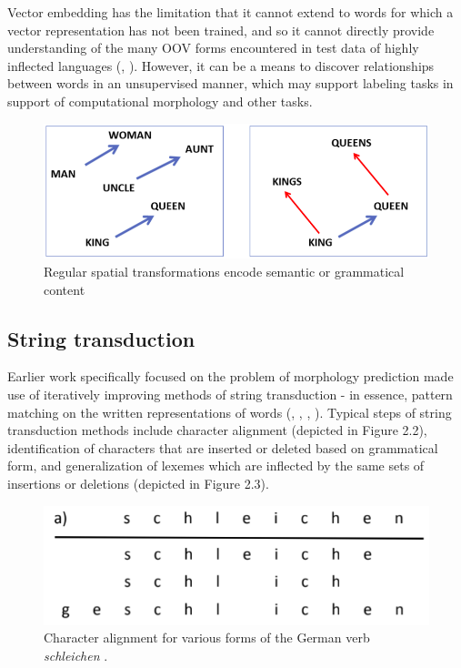 Vector embedding has the limitation that it cannot extend to words for which a vector representation has not been trained, and so it cannot directly provide understanding of the many OOV forms encountered in test data of highly inflected languages (\cite{Soricut2015}, \cite{Cotterell2019}). However, it can be a means to discover relationships between words in an unsupervised manner, which may support labeling tasks in support of computational morphology and other tasks.

\begin{figure}[t]
\includegraphics[width=12cm]{images/semantic_transform.png}
\centering
\caption{Regular spatial transformations encode semantic or grammatical content \parencite{Mikolov2013}}
\end{figure}

\subsection{String transduction}

Earlier work specifically focused on the problem of morphology prediction made use of iteratively improving methods of string transduction - in essence, pattern matching on the written representations of words (\cite{Durrett2013}, \cite{Hulden2014}, \cite{Nicolai2015}, \cite{Ahlberg2015}). Typical steps of string transduction methods include character alignment (depicted in Figure 2.2), identification of characters that are inserted or deleted based on grammatical form, and generalization of lexemes which are inflected by the same sets of insertions or deletions (depicted in Figure 2.3). 

\begin{figure}[t]
\includegraphics[width=12cm]{images/Nicolai2015_schleichen.png}
\centering
\caption{Character alignment for various forms of the German verb \textit{schleichen} \parencite{Nicolai2015}.}
\end{figure}

